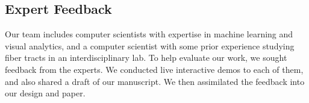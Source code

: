 




\vspace*{-0.06in}
\subsection{Expert Feedback}

\noindent Our team includes computer scientists with expertise in machine learning and visual analytics, and a computer scientist with some prior experience studying fiber tracts in an interdisciplinary lab. To help evaluate our work, we sought feedback from the experts.%
We conducted live interactive demos to each of them, and also shared a draft of our manuscript. We then assimilated the feedback into our design and paper.

